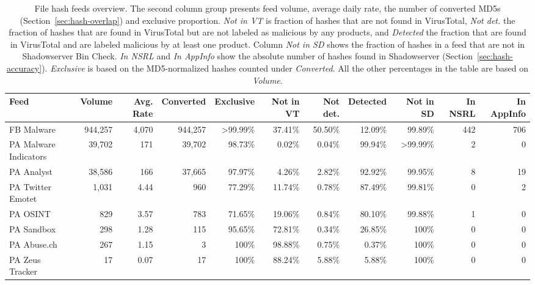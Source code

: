 \begin{table*}[htt]
\footnotesize \tabcolsep=0.11cm
\caption{File hash feeds overview.
The second column group presents feed volume, average daily rate, the number of converted MD5s (Section~\ref{sec:hash-overlap}) and exclusive proportion.
\textit{Not in VT} is fraction of hashes that are not found in VirusTotal, \textit{Not det.} the fraction of hashes that are found in VirusTotal but are not labeled as malicious by any products, and \textit{Detected} the fraction that are found in VirusTotal and are labeled malicious by at least one product. Column \textit{Not in SD} shows the fraction of hashes in a feed that are not in Shadowserver Bin Check. \textit{In NSRL} and \textit{In AppInfo} show the absolute number of hashes found in Shadowserver (Section~\ref{sec:hash-accuracy}). \textit{Exclusive} is based on the MD5-normalized hashes counted under \textit{Converted}. All the other percentages in the table are based on \textit{Volume}.
}
\centering
\small
\begin{tabular}{l | r r r r| r r r | r r r }
\toprule
 Feed         &   Volume  &  Avg. Rate  & Converted &   Exclusive  &   Not in VT    &  Not det.  &   Detected   &   Not in SD &   In NSRL   &  In AppInfo  \\
\midrule
 FB Malware              &    944,257  &  4,070    & 944,257   &    >99.99\%    &     37.41\%    &    50.50\%      &     12.09\%          &    99.89\% &     442 &             706 \\
 PA Malware Indicators   &    39,702   &  171      & 39,702    &     98.73\%    &      0.02\%    &     0.04\%      &     99.94\%          &   >99.99\% &       2 &             0  \\
 PA Analyst              &    38,586   &  166      & 37,665    &     97.97\%    &      4.26\%    &     2.82\%      &     92.92\%          &    99.95\% &       8 &             19 \\
 PA Twitter Emotet       &    1,031    &  4.44     & 960       &     77.29\%    &     11.74\%    &     0.78\%      &     87.49\%          &    99.81\% &       0 &             2  \\
 PA OSINT                &    829      &  3.57     & 783       &     71.65\%    &     19.06\%    &     0.84\%      &     80.10\%          &    99.88\% &       1 &             0  \\
 PA Sandbox              &    298      &  1.28     & 115       &     95.65\%    &     72.81\%    &     0.34\%      &     26.85\%          &    100\% &         0 &             0  \\
 PA Abuse.ch             &    267      &  1.15     & 3         &       100\%    &     98.88\%    &     0.75\%      &      0.37\%          &    100\% &         0 &             0  \\
 PA Zeus Tracker         &    17       &  0.07     & 17        &       100\%    &     88.24\%    &     5.88\%      &      5.88\%          &    100\% &         0 &             0  \\
\bottomrule
\end{tabular}
\label{tab:md5-volume}
\end{table*}



%

